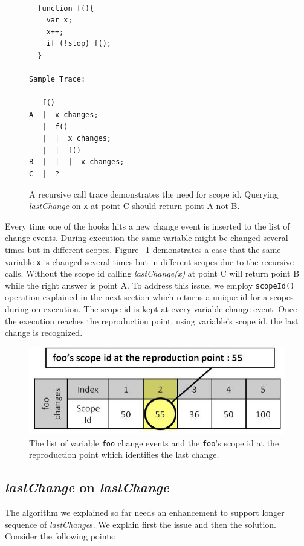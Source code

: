 \documentclass[preprint]{sigplanconf}
\begin{document}
\begin{figure}[htp]
\begin{verbatim}

  function f(){
    var x;
    x++;
    if (!stop) f();
  }

Sample Trace:

   f()
A  |  x changes; 
   |  f()
   |  |  x changes;
   |  |  f()
B  |  |  |  x changes; 
C  |  ?

\end{verbatim}
\caption{A recursive call trace demonstrates the need for scope
  id. Querying \textit{lastChange} on \texttt{x} at point C should
  return point A not B.}
\label{fig:recursive}
\end{figure}


Every time one of the hooks hits a new change event is inserted to the
list of change events. During execution the same variable might be
changed several times but in different scopes. Figure
~\ref{fig:recursive} demonstrates a case that the same variable
\texttt{x} is changed several times but in different scopes due to the
recursive calls. Without the scope id calling \textit{lastChange(x)}
at point C will return point B while the right answer is point A. To
address this issue, we employ \texttt{scopeId()} operation-explained
in the next section-which returns a unique id for a scopes during on
execution. The scope id is kept at every variable change event. Once
the execution reaches the reproduction point, using variable's scope
id, the last change is recognized.

\begin{figure}[htp]
\includegraphics[width=.48\textwidth]{7-foo-changes2.jpg}
\caption{The list of variable \texttt{foo} change events and the
  \texttt{foo}'s scope id at the reproduction point which identifies
  the last change.}
\label{fig:foo-changes2}
\end{figure}

 
\subsection{\textit{lastChange} on \textit{lastChange}}
The algorithm we explained so far needs an enhancement to support
longer sequence of \textit{lastChange}s. We explain first the issue
and then the solution. Consider the following points:
\end{document}
